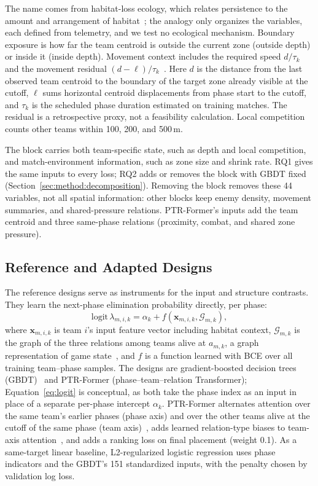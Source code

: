 \documentclass[sigconf,anonymous]{acmart}
\begin{document}
The name comes from habitat-loss ecology, which relates persistence to the amount and arrangement of habitat~\cite{Fahrig03}; the analogy only organizes the variables, each defined from telemetry, and we test no ecological mechanism. Boundary exposure is how far the team centroid is outside the current zone (outside depth) or inside it (inside depth). Movement context includes the required speed $d/\tau_k$ and the movement residual $(d-\ell)/\tau_k$~\cite{Nathan08}. Here $d$ is the distance from the last observed team centroid to the boundary of the target zone already visible at the cutoff, $\ell$ sums horizontal centroid displacements from phase start to the cutoff, and $\tau_k$ is the scheduled phase duration estimated on training matches. The residual is a retrospective proxy, not a feasibility calculation. Local competition counts other teams within 100, 200, and 500\,m.

The block carries both team-specific state, such as depth and local competition, and match-environment information, such as zone size and shrink rate. RQ1 gives the same inputs to every loss; RQ2 adds or removes the block with GBDT fixed (Section~\ref{sec:method:decomposition}). Removing the block removes these 44 variables, not all spatial information: other blocks keep enemy density, movement summaries, and shared-pressure relations. PTR-Former's inputs add the team centroid and three same-phase relations (proximity, combat, and shared zone pressure).


\subsection{Reference and Adapted Designs}
\label{sec:method:rq2}
The reference designs serve as instruments for the input and structure contrasts. They learn the next-phase elimination probability directly, per phase:
\begin{equation}
\mathrm{logit}\,\lambda_{m,i,k}=\alpha_k+f(\mathbf{x}_{m,i,k},\mathcal{G}_{m,k}),
\label{eq:logit}
\end{equation}
where $\mathbf{x}_{m,i,k}$ is team $i$'s input feature vector including habitat context, $\mathcal{G}_{m,k}$ is the graph of the three relations among teams alive at $a_{m,k}$, a graph representation of game state~\cite{Xenopoulos21}, and $f$ is a function learned with BCE over all training team--phase samples. The designs are gradient-boosted decision trees (GBDT)~\cite{Friedman01} and PTR-Former (phase--team--relation Transformer); Equation~\eqref{eq:logit} is conceptual, as both take the phase index as an input in place of a separate per-phase intercept $\alpha_k$. PTR-Former alternates attention over the same team's earlier phases (phase axis) and over the other teams alive at the cutoff of the same phase (team axis)~\cite{Vaswani17,Ngiam22}, adds learned relation-type biases to team-axis attention~\cite{Ying21}, and adds a ranking loss on final placement (weight 0.1). As a same-target linear baseline, L2-regularized logistic regression uses phase indicators and the GBDT's 151 standardized inputs, with the penalty chosen by validation log loss.
\end{document}

